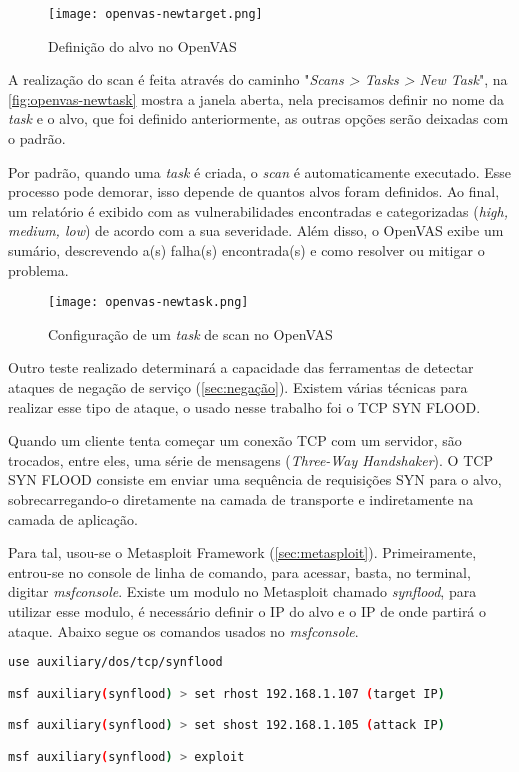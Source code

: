 \begin{figure}[!htb]
\centering
\caption{Definição do alvo no OpenVAS}
\texttt{[image: openvas-newtarget.png]}
\label{fig:openvas-newtarget}
\end{figure}

A realização do scan é feita através do caminho "\textit{Scans > Tasks > New Task}", na \autoref{fig:openvas-newtask} mostra a janela aberta, nela precisamos definir no nome da \textit{task} e o alvo, que foi definido anteriormente, as outras opções serão deixadas com o padrão. 

Por padrão, quando uma \textit{task} é criada, o \textit{scan} é automaticamente executado. Esse processo pode demorar, isso depende de quantos alvos foram definidos. Ao final, um relatório é exibido com as vulnerabilidades encontradas e categorizadas (\textit{high, medium, low}) de acordo com a sua severidade. Além disso, o OpenVAS exibe um sumário, descrevendo a(s) falha(s) encontrada(s) e como resolver ou mitigar o problema.

\begin{figure}[!htb]
\centering
\caption{Configuração de um \textit{task} de scan no OpenVAS}
\texttt{[image: openvas-newtask.png]}
\label{fig:openvas-newtask}
\end{figure}

Outro teste realizado determinará a capacidade das ferramentas de detectar ataques de negação de serviço (\autoref{sec:negação}). Existem várias técnicas para realizar esse tipo de ataque, o usado nesse trabalho foi o TCP SYN FLOOD. 

Quando um cliente tenta começar um conexão TCP com um servidor, são trocados, entre eles, uma série de mensagens (\textit{Three-Way Handshaker}). O TCP SYN FLOOD consiste em enviar uma sequência de requisições SYN para o alvo, sobrecarregando-o diretamente na camada de transporte e indiretamente na camada de aplicação.

Para tal, usou-se o Metasploit Framework (\autoref{sec:metasploit}). Primeiramente, entrou-se no console de linha de comando, para acessar, basta, no terminal, digitar \textit{msfconsole}. Existe um modulo no Metasploit chamado \textit{synflood}, para utilizar esse modulo, é necessário definir o IP do alvo e o IP de onde partirá o ataque. Abaixo segue os comandos usados no \textit{msfconsole}.

\begin{lstlisting}[language=bash, frame=single]
use auxiliary/dos/tcp/synflood

msf auxiliary(synflood) > set rhost 192.168.1.107 (target IP)

msf auxiliary(synflood) > set shost 192.168.1.105 (attack IP)

msf auxiliary(synflood) > exploit
\end{lstlisting}

